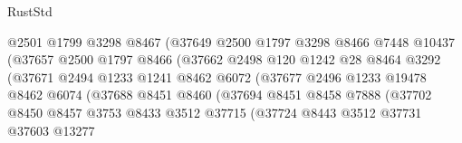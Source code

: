 \begin{lexlean}{RustStd}
\begin{coremodule}
                                  @2501
                                  @1799
                                  @3298
                                  @8467
                                  (@37649
                                    @2500
                                    @1797
                                    @3298
                                    @8466
                                    @7448
                                    @10437
                                    (@37657
                                      @2500
                                      @1797
                                      @8466
                                      (@37662
                                        @2498
                                        @120
                                        @1242
                                        @28
                                        @8464
                                        @3292
                                        (@37671
                                          @2494
                                          @1233
                                          @1241
                                          @8462
                                          @6072
                                          (@37677
                                            @2496
                                            @1233
                                            @19478
                                            @8462
                                            @6074
                                            (@37688
                                              @8451
                                              @8460
                                              (@37694
                                                @8451
                                                @8458
                                                @7888
                                                (@37702
                                                  @8450
                                                  @8457
                                                  @3753
                                                  @8433
                                                  @3512
                                                  @37715
                                                  (@37724
                                                    @8443
                                                    @3512
                                                    @37731
                                                    @37603
                                                    @13277

\end{coremodule}
\end{lexlean}
